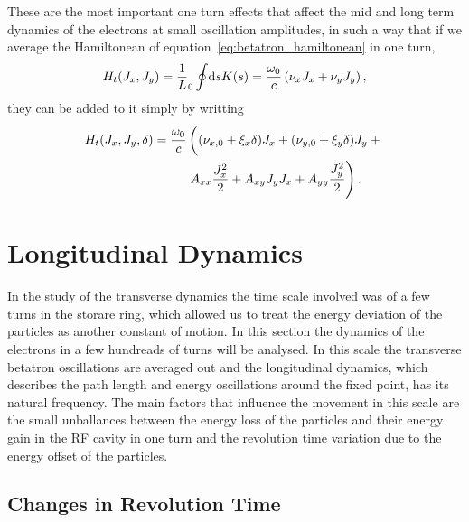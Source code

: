     These are the most important one turn effects that affect the mid and long term dynamics of the electrons at small oscillation amplitudes, in such a way that if we average the Hamiltonean of equation~\eqref{eq:betatron_hamiltonean} in one turn,
    \begin{align}
        H_t(J_x, J_y) = \frac1L_0\oint\!\text{d}s K(s) = \frac{\omega_0}{c}\left(\nu_xJ_x + \nu_yJ_y\right),
    \end{align}
    they can be added to it simply by writting
    \begin{align}\label{eq:average_transverse_hamiltonean}\nonumber
        H_t(J_x, J_y, \delta) = \frac{\omega_0}{c}
                                &\left(
                                    (\nu_{x,0} + \xi_x \delta) J_x +
                                    (\nu_{y,0} + \xi_y \delta) J_y +
                                \vphantom{\frac{1_1^2}{2}}\right.\\ &\left.
                                    A_{xx} \frac{J_x^2}{2} + A_{xy} J_yJ_x +
                                    A_{yy} \frac{J_y^2}{2}
                                \right).
    \end{align}

\section{Longitudinal Dynamics}

    In the study of the transverse dynamics the time scale involved was of a few turns in the storare ring, which allowed us to treat the energy deviation of the particles as another constant of motion. In this section the dynamics of the electrons in a few hundreads of turns will be analysed. In this scale the transverse betatron oscillations are averaged out and the longitudinal dynamics, which describes the path length and energy oscillations around the fixed point, has its natural frequency. The main factors that influence the movement in this scale are the small unballances between the energy loss of the particles and their energy gain in the RF cavity in one turn and the revolution time variation due to the energy offset of the particles.

\subsection{Changes in Revolution Time}\label{sec:longitudinal_deviations}

